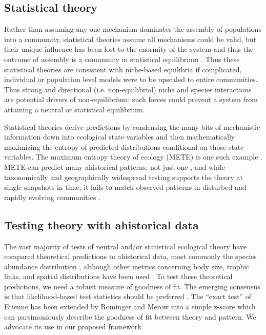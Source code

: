 \documentclass[12pt]{article}
\begin{document}
\subsection{Statistical theory} \label{sec:statThr}

Rather than assuming any one mechanism dominates the assembly of
populations into a community,  statistical  theories
assume all mechanisms could be valid, but their unique influence
has been lost to the enormity of the system and thus the outcome of
assembly is a community in statistical equilibrium \citep{Harte2011-um, Pueyo2007-iq}. Thus these statistical theories are consistent with niche-based equilibria \citep{pueyo2007, neill2009} if complicated, individual or population level models were to be upscaled to entire communities. Thus strong and directional (i.e. non-equilibrial) niche and species interactions are potential drivers of
non-equilibrium: such forces could prevent a system from attaining a neutral or
statistical equilibrium.

Statistical theories derive predictions by condensing the many bits of mechanistic information down into ecological state
variables \citep{Harte2011-um} and then mathematically maximizing the entropy of predicted distributions conditional on those state variables. The maximum entropy theory of ecology (METE) is one such example \citep{Harte2011-um}. METE can predict many ahistorical patterns, not just one \citep{Harte2011-um}, and while taxonomically and geographically widespread testing supports the theory \citep{Harte2011-um,
  White2012-yw, Xiao2015-jv} at single snapshots in
time, it fails to match observed patterns in disturbed and rapidly
evolving communities \citep{Rominger2015-kb, Harte2011-um}.

\subsection{Testing theory with ahistorical data}

The vast majority of tests of neutral and/or statistical ecological
theory have compared theoretical predictions to ahistorical data, most
commonly the species abundance distribution \citep{Hubbell2001-dx,
  Harte2011-um, White2012-yw}, although other metrics concerning body size, trophic links, and spatial distributions have been used
\citep[e.g.,][]{Xiao2015-jv, Rominger2015-kb, Harte2011-um}. To test these theoretical predictions, we need a robust measure of
goodness of fit. The emerging consensus is that
likelihood-based test statistics should be preferred
\citep{baldridge2016}. The ``exact test'' of Etienne \citep{etienne2007} has
been extended by Rominger and Merow \citep{meteR} into a simple z-score which can
parsimoniously describe the goodness of fit between theory and
pattern.  We advocate its use in our proposed framework.
\end{document}
